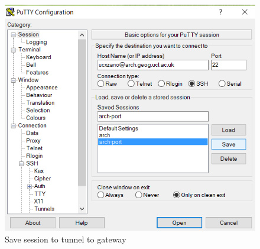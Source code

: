 \documentclass[a4paper]{article}
\begin{document}
\begin{figure}[p]
  \centering
    \includegraphics[width=\textwidth]{figures/putty3_save_tunnel_session.png}
  \caption{Save session to tunnel to gateway}
  \label{fig:putty3}
\end{figure}
\end{document}
